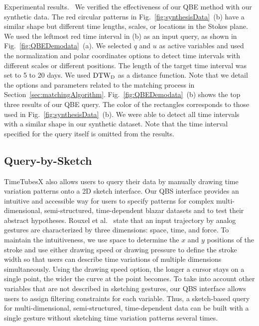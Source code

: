 \textsf{Experimental results.\ } We verified the effectiveness of our QBE method with our synthetic data.
The red circular patterns in Fig.~\ref{fig:synthesisData}~(b) have a similar shape but different time lengths, scales, or locations in the Stokes plane.
We used the leftmost red time interval in (b) as an input query, as shown in Fig.~\ref{fig:QBEDemodata}~(a).
We selected $q$ and $u$ as active variables and used the normalization and polar coordinates options to detect time intervals with different scales or different positions.
The length of the target time interval was set to 5 to 20 days.
We used $\rm{DTW}_{\rm D}$ as a distance function.
Note that we detail the options and parameters related to the matching process in Section~\ref{sec:matchingAlgorithm}.
Fig.~\ref{fig:QBEDemodata}~(b) shows the top three results of our QBE query.
The color of the rectangles corresponds to those used in Fig.~\ref{fig:synthesisData}~(b).
We were able to detect all time intervals with a similar shape in our synthetic dataset.
Note that the time interval specified for the query itself is omitted from the results.

\subsection{Query-by-Sketch}\label{sec:QBS}
TimeTubesX also allows users to query their data by manually drawing time variation patterns onto a 2D sketch interface.
Our QBS interface provides an intuitive and accessible way for users to specify patterns for complex multi-dimensional, semi-structured, time-dependent blazar datasets and to test their abstract hypotheses.
Rouxel et al.~\cite{Rouxel2014} state that an input trajectory by analog gestures are characterized by three dimensions: space, time, and force.
To maintain the intuitiveness, 
we use space to determine the $x$ and $y$ positions of the stroke
and use either drawing speed or drawing pressure to define the stroke width 
so that users can describe time variations of multiple dimensions simultaneously.
Using the drawing speed option, the longer a cursor stays on a single point, the wider the curve at the point becomes.
To take into account other variables that are not described in sketching gestures, 
our QBS interface allows users to assign filtering constraints for each variable.
Thus, a sketch-based query for multi-dimensional, semi-structured, time-dependent data can be built with a single gesture
without sketching time variation patterns several times.


